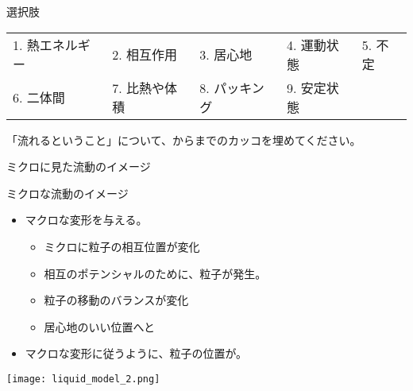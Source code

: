 \documentclass[uplatex,dvipdfmx,a4paper,11pt]{jsarticle}
\begin{document}
\begin{qlist}
\begin{qlist2}
		\end{qlist2}

		\begin{itembox}[l]{選択肢}
			\begin{center}
				\begin{tabular}{lllll}
					1. 熱エネルギー	&2. 相互作用	&3. 居心地	&4. 運動状態	&5. 不定\\
					6. 二体間	&7. 比熱や体積		&8. パッキング	&9. 安定状態
				\end{tabular}
			\end{center}
		\end{itembox}
\end{qlist}

\begin{qlist}
	\qitem 「流れるということ」について、からまでのカッコを埋めてください。
		\begin{qlist2}
			\qitem ミクロに見た流動のイメージ
				\begin{center}
					\begin{minipage}{0.56\textwidth}
						\begin{itembox}[l]{ミクロな流動のイメージ}
							\begin{itemize}
								\item マクロな変形を与える。
								\begin{itemize}
									\item ミクロに粒子の相互位置が変化
									\item 相互のポテンシャルのために、\qbox{}粒子が発生。
									\item 粒子の移動のバランスが変化
									\item 居心地のいい位置へと\qbox{}
								\end{itemize}
								\item マクロな変形に従うように、粒子の位置が\qbox{}。
							\end{itemize}
						\end{itembox}
					\end{minipage}
					\begin{minipage}{0.3\textwidth}
						\begin{center}
						\texttt{[image: liquid\_model\_2.png]}
						\end{center}
					\end{minipage}
				\end{center}


\end{qlist2}
\end{qlist}
\end{document}
